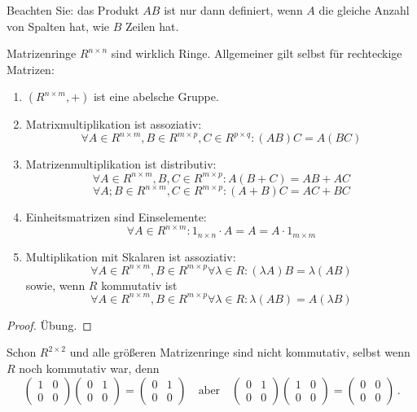 \begin{remark}
    Beachten Sie: das Produkt $AB$ ist nur dann definiert, wenn $A$ die gleiche
    Anzahl von Spalten hat, wie $B$ Zeilen hat.
\end{remark}


\begin{lemma}[Ringeigenschaften]
    \label{matrizen:ring_eigenschaften}
    Matrizenringe $R^{n\times n}$ sind wirklich Ringe. Allgemeiner gilt selbst für rechteckige Matrizen:
    \begin{enumerate}
        \item $(R^{n\times m},+)$ ist eine abelsche Gruppe.
        \item Matrixmultiplikation ist assoziativ:
        \[\forall A\in R^{n\times m}, B\in R^{m\times p}, C\in R^{p\times q}: (AB)C = A(BC)\]
        \item Matrizenmultiplikation ist distributiv:
        \[\forall A\in R^{n\times m}, B,C\in R^{m\times p} : A(B+C) = AB+AC\]
        \[\forall A;B\in R^{n\times m}, C\in R^{m\times p} : (A+B)C = AC+BC\]
        \item Einheitsmatrizen sind Einselemente:
        \[\forall A \in R^{n \times m}: 1_{n\times n} \cdot A = A = A\cdot 1_{m\times m}\]
        \item Multiplikation mit Skalaren ist assoziativ:
        \[\forall A\in R^{n\times m}, B\in R^{m\times p}\forall \lambda\in R: (\lambda A)B = \lambda (AB)\]
        sowie, wenn $R$ kommutativ ist
        \[\forall A\in R^{n\times m}, B\in R^{m\times p}\forall \lambda\in R: \lambda (AB)=A(\lambda B)\]
    \end{enumerate}
\end{lemma}

\begin{proof}
    Übung.
\end{proof}

\begin{example}
    Schon $R^{2\times 2}$ und alle größeren Matrizenringe sind nicht kommutativ, selbst wenn $R$ noch kommutativ war, denn
    \[
        \begin{pmatrix}
            1& 0\\0& 0
        \end{pmatrix}
        \begin{pmatrix}
            0& 1\\0& 0
        \end{pmatrix}
        = \begin{pmatrix}
              0& 1\\0& 0
        \end{pmatrix}
        \quad \text{aber} \quad
        \begin{pmatrix}
            0& 1\\0& 0
        \end{pmatrix}
        \begin{pmatrix}
            1& 0\\0& 0
        \end{pmatrix}
        = \begin{pmatrix}
              0& 0\\0& 0
        \end{pmatrix} \, .
    \]
\end{example}
